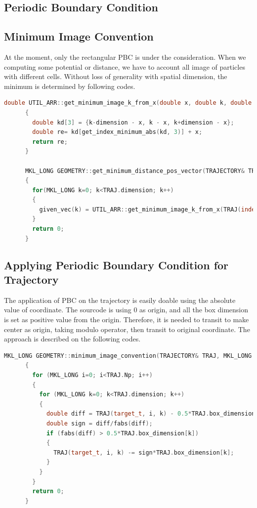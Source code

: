 \documentclass[10pt, a4paper]{report}
\begin{document}
\begin{appendices}
  \section{Periodic Boundary Condition}
  \subsection{Minimum Image Convention}
    At the moment, only the rectangular PBC is under the consideration. When we computing some potential or distance, we have to account all image of particles with different cells. Without loss of generality with spatial dimension, the minimum is determined by following codes.
    \begin{lstlisting}[language=C++, frame=single]
      double UTIL_ARR::get_minimum_image_k_from_x(double x, double k, double dimension)
      {
        double kd[3] = {k-dimension - x, k - x, k+dimension - x};
        double re= kd[get_index_minimum_abs(kd, 3)] + x;
        return re;
      }

      MKL_LONG GEOMETRY::get_minimum_distance_pos_vector(TRAJECTORY& TRAJ, MKL_LONG index_t, MKL_LONG given_index, MKL_LONG target_index, MATRIX& given_vec)
      {
        for(MKL_LONG k=0; k<TRAJ.dimension; k++)
        {
          given_vec(k) = UTIL_ARR::get_minimum_image_k_from_x(TRAJ(index_t, given_index, k), TRAJ(index_t, target_index, k), TRAJ.box_dimension[k]);
        }
        return 0;
      }
    \end{lstlisting}
  \subsection{Applying Periodic Boundary Condition for Trajectory}
    The application of PBC on the trajectory is easily doable using the absolute value of coordinate. The sourcode is using 0 as origin, and all the box dimension is set as positive value from the origin. Therefore, it is needed to transit to make center as origin, taking modulo operator, then transit to original coordinate. The approach is described on the following codes.
    \begin{lstlisting}[language=C++, frame=single]
      MKL_LONG GEOMETRY::minimum_image_convention(TRAJECTORY& TRAJ, MKL_LONG target_t)
      {
        for (MKL_LONG i=0; i<TRAJ.Np; i++)
        {
          for (MKL_LONG k=0; k<TRAJ.dimension; k++)
          {
            double diff = TRAJ(target_t, i, k) - 0.5*TRAJ.box_dimension[k];
            double sign = diff/fabs(diff);
            if (fabs(diff) > 0.5*TRAJ.box_dimension[k])
            {
              TRAJ(target_t, i, k) -= sign*TRAJ.box_dimension[k];
            }
          }
        }
        return 0;
      }
    \end{lstlisting}
  

\end{appendices}
\end{document}
